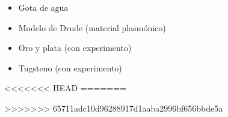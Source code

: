 \documentclass[12pts,a4paper]{book}
\begin{document}
\begin{itemize}
 \item Gota de agua
 \item Modelo de Drude (material plasmónico)
 \item Oro y plata (con experimento)
 \item Tugsteno (con experimento)
\end{itemize}

<<<<<<< HEAD
\setlength{}
=======
%
%

>>>>>>> 65711adc10d96288917d1aaba2996bf656bbde5a
\printbibliography

\printindex
\end{document}
